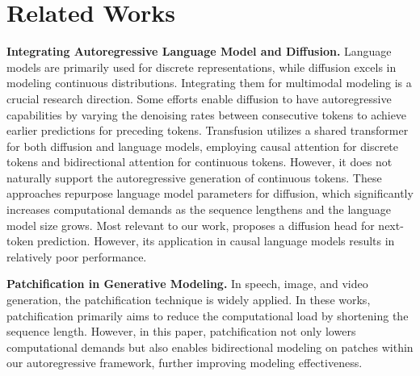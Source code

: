\section{Related Works}
\textbf{Integrating Autoregressive Language Model and Diffusion.} 
Language models are primarily used for discrete representations, while diffusion excels in modeling continuous distributions. Integrating them for multimodal modeling is a crucial research direction.
Some efforts \cite{wu2023ar,liu2024autoregressive,chen2024diffusion} enable diffusion to have autoregressive capabilities by varying the denoising rates between consecutive tokens to achieve earlier predictions for preceding tokens.
Transfusion\cite{zhou2024transfusion} utilizes a shared transformer for both diffusion and language models, employing causal attention for discrete tokens and bidirectional attention for continuous tokens. However, it does not naturally support the autoregressive generation of continuous tokens.
These approaches repurpose language model parameters for diffusion, which significantly increases computational demands as the sequence lengthens and the language model size grows.
Most relevant to our work, \citet{li2024autoregressive} proposes a diffusion head for next-token prediction. However, its application in causal language models results in relatively poor performance.

\textbf{Patchification in Generative Modeling.}
In speech\cite{wang2017tacotron,meng2024autoregressive,chen2024vall}, image\cite{peebles2023scalable,li2024imagefolder}, and video generation\cite{liu2024sora}, the patchification technique is widely applied. In these works, patchification primarily aims to reduce the computational load by shortening the sequence length. However, in this paper, patchification not only lowers computational demands but also enables bidirectional modeling on patches within our autoregressive framework, further improving modeling effectiveness.


